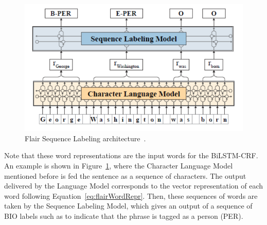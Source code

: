 \begin{figure}[!h]
    \centering
    \includegraphics[scale=.5]{imagenes/2_theorical_framework/information_extraction/sequenceLabelingModel.PNG}
    \caption{Flair Sequence Labeling architecture~\cite{seqlab:flair-AkbikBBRSV19}.}
    \label{fig:flairArchitecture}
\end{figure}

Note that these word representations are the input words for the BiLSTM-CRF. An example is shown in 
Figure~\ref{fig:flairArchitecture}, where the Character Language Model mentioned before is fed 
the sentence  as a sequence of characters. The output 
delivered by the Language Model corresponds to the vector representation of each word following 
Equation~\ref{eq:flairWordRepr}. Then, these sequences of words are taken by the Sequence 
Labeling Model, which gives an output of a sequence of BIO labels such as to indicate that 
the phrase  is tagged as a person (PER).
